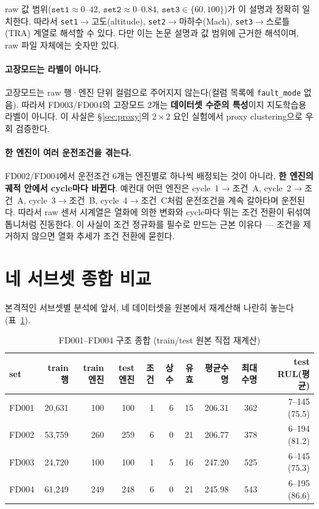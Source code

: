 \documentclass[11pt]{article}
\begin{document}
raw 값 범위($\texttt{set1}\approx 0\text{--}42$, $\texttt{set2}\approx 0\text{--}0.84$, $\texttt{set3}\in\{60,100\}$)가 이 설명과 정확히 일치한다.
따라서 \texttt{set1}$\to$고도(altitude), \texttt{set2}$\to$마하수(Mach), \texttt{set3}$\to$스로틀(TRA) 계열로 해석할 수 있다.
다만 이는 논문 설명과 값 범위에 근거한 해석이며, raw 파일 자체에는 숫자만 있다.

\paragraph{고장모드는 라벨이 아니다.}
고장모드는 raw 행·엔진 단위 컬럼으로 주어지지 않는다(컬럼 목록에 \texttt{fault\_mode} 없음).
따라서 FD003/FD004의 고장모드 2개는 \textbf{데이터셋 수준의 특성}이지 지도학습용 라벨이 아니다.
이 사실은 \S\ref{sec:proxy}의 $2\times2$ 요인 실험에서 proxy clustering으로 우회 검증한다.

\paragraph{한 엔진이 여러 운전조건을 겪는다.}
FD002/FD004에서 운전조건 6개는 엔진별로 하나씩 배정되는 것이 아니라, \textbf{한 엔진의 궤적 안에서 cycle마다 바뀐다}.
예컨대 어떤 엔진은 cycle~1$\to$조건~A, cycle~2$\to$조건~A, cycle~3$\to$조건~B, cycle~4$\to$조건~C처럼 운전조건을 계속 갈아타며 운전된다.
따라서 raw 센서 시계열은 열화에 의한 변화와 cycle마다 뛰는 조건 전환이 뒤섞여 톱니처럼 진동한다.
이 사실이 조건 정규화를 필수로 만드는 근본 이유다 — 조건을 제거하지 않으면 열화 추세가 조건 전환에 묻힌다.

\section{네 서브셋 종합 비교}

본격적인 서브셋별 분석에 앞서, 네 데이터셋을 원본에서 재계산해 나란히 놓는다(표~\ref{tab:structure}).

\begin{table}[H]
\centering
\caption{FD001--FD004 구조 종합 (train/test 원본 직접 재계산)}
\label{tab:structure}
\begin{tabular}{lrrrrrrrrr}
\toprule
set & train행 & train엔진 & test엔진 & 조건 & 상수 & 유효 & 평균수명 & 최대수명 & test RUL(평균) \\
\midrule
FD001 & 20{,}631 & 100 & 100 & 1 & 6 & 15 & 206.31 & 362 & 7--145 (75.5) \\
FD002 & 53{,}759 & 260 & 259 & 6 & 0 & 21 & 206.77 & 378 & 6--194 (81.2) \\
FD003 & 24{,}720 & 100 & 100 & 1 & 5 & 16 & 247.20 & 525 & 6--145 (75.3) \\
FD004 & 61{,}249 & 249 & 248 & 6 & 0 & 21 & 245.98 & 543 & 6--195 (86.6) \\
\bottomrule
\end{tabular}
\end{table}
\end{document}
